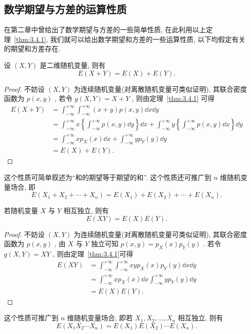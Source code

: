   \subsection{数学期望与方差的运算性质}\label{ssec:3.4.2}
  在第二章中曾给出了数学期望与方差的一些简单性质, 在此利用以上定理~\ref{thm:3.4.1}, 我们就可以给出数学期望和方差的一些运算性质, 以下均假定有关的期望和方差存在.
  \begin{property}\label{pro:3.4.1}
  	设 $(X,Y)$ 是二维随机变量, 则有
  	\begin{equation}\label{eq:3.4.2}
  		E(X+Y)=E(X)+E(Y).
  	\end{equation}
  	\begin{proof}
  		不妨设 $(X,Y)$ 为连续随机变量(对离散随机变量可类似证明), 其联合密度函数为 $p(x,y)$ , 若令 $g(X,Y)=X+Y$ , 则由定理~\ref{thm:3.4.1} 可得
  		\begin{align*}
  			E(X+Y)&=\int_{-\infty}^{+\infty} \int_{-\infty}^{+\infty}(x+y) p(x, y) \dd x \dd y\\
  			&=\int_{-\infty}^{+\infty} x\left\{\int_{-\infty}^{+\infty} p(x, y) \dd y \right\} \dd x+\int_{-\infty}^{+\infty} y\left\{\int_{-\infty}^{+\infty} p(x, y) \dd x\right\} \dd y\\
  			&=\int_{-\infty}^{+\infty} x p_{X}(x) \dd x+\int_{-\infty}^{+\infty} y p_{Y}(y) \dd y\\
  			&=E(X)+E(Y).
  		\end{align*}
  	\end{proof}
  这个性质可简单叙述为“和的期望等于期望的和”. 这个性质还可推广到 $n$ 维随机变量场合, 即
  \begin{equation}\label{eq:3.4.3}
  	E\left(X_{1}+X_{2}+\cdots+X_{n}\right)=E\left(X_{1}\right)+E\left(X_{2}\right)+\cdots+E\left(X_{n}\right).
  \end{equation}
  \end{property}
  \begin{property}\label{pro:3.4.2}
  	若随机变量 $X$ 与 $Y$ 相互独立, 则有
  	\begin{equation}\label{eq:3.4.4}
  		E(XY)=E(X)E(Y).
  	\end{equation}
  	\begin{proof}
  		不妨设 $(X,Y)$ 为连续随机变量(对离散随机变量可类似证明), 其联合密度函数为 $p(x,y)$ , 由 $X$ 与 $Y$ 独立可知 $p(x,y)=p_{X}(x)p_{Y}(y)$ . 若令 $g(X,Y)=XY$ , 则由定理~\ref{thm:3.4.1}可得
  		\begin{align*}
  			E(XY)&=\int_{-\infty}^{+\infty} \int_{-\infty}^{+\infty} x y p_{X}(x) p_{Y}(y) \dd x \dd y\\
  			&=\int_{-\infty}^{+\infty} x p_{X}(x) \dd x \int_{-\infty}^{+\infty} y p_{Y}(y) \dd y\\
  			&=E(X)E(Y).
  		\end{align*}
  	\end{proof}
  这个性质可推广到 $n$ 维随机变量场合, 即若 $X_{1}, X_{2}, \ldots, X_{n}$ 相互独立, 则有
  \begin{equation}\label{eq:3.4.5}
  	E\left(X_{1} X_{2} \cdots X_{n}\right)=E\left(X_{1}\right) E\left(X_{2}\right) \cdots E\left(X_{n}\right).
  \end{equation}
  \end{property}
